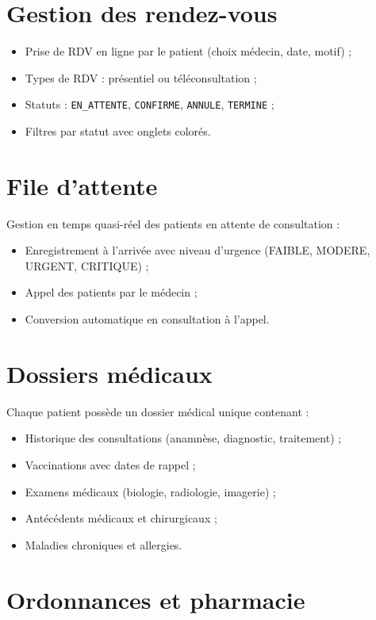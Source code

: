 \documentclass[12pt, a4paper]{report}
\begin{document}
\section{Gestion des rendez-vous}

\begin{itemize}
  \item Prise de RDV en ligne par le patient (choix médecin, date, motif) ;
  \item Types de RDV : présentiel ou téléconsultation ;
  \item Statuts : \texttt{EN\_ATTENTE}, \texttt{CONFIRME}, \texttt{ANNULE},
        \texttt{TERMINE} ;
  \item Filtres par statut avec onglets colorés.
\end{itemize}

\section{File d'attente}

Gestion en temps quasi-réel des patients en attente de consultation :
\begin{itemize}
  \item Enregistrement à l'arrivée avec niveau d'urgence (FAIBLE, MODERE,
        URGENT, CRITIQUE) ;
  \item Appel des patients par le médecin ;
  \item Conversion automatique en consultation à l'appel.
\end{itemize}

\section{Dossiers médicaux}

Chaque patient possède un dossier médical unique contenant :
\begin{itemize}
  \item Historique des consultations (anamnèse, diagnostic, traitement) ;
  \item Vaccinations avec dates de rappel ;
  \item Examens médicaux (biologie, radiologie, imagerie) ;
  \item Antécédents médicaux et chirurgicaux ;
  \item Maladies chroniques et allergies.
\end{itemize}

\section{Ordonnances et pharmacie}
\end{document}
